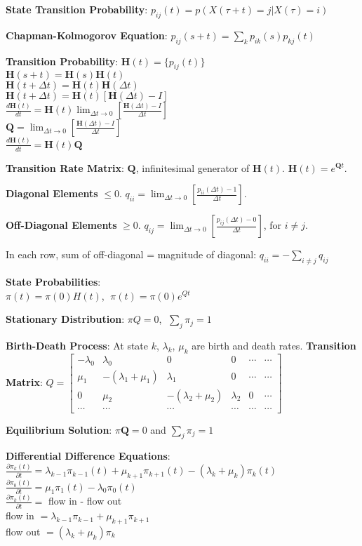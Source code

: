 \documentclass{scrartcl}
\begin{document}
\begin{multicols*}{3}
{\bf State Transition Probability}: $p_{ij}(t) = p(X(\tau+t)=j|X(\tau)=i)$

{\bf Chapman-Kolmogorov Equation}: $p_{ij}(s+t) = \sum_kp_{ik}(s)p_{kj}(t)$

{\bf Transition Probability}:
$\bm{H}(t) = \{p_{ij}(t)\}$ \\
$\bm{H}(s+t) = \bm{H}(s)\bm{H}(t)$ \\
$\bm{H}(t+\Delta t) = \bm{H}(t)\bm{H}(\Delta t)$ \\
$\bm{H}(t+\Delta t) = \bm{H}(t)[\bm{H}(\Delta t)-I]$ \\
$\frac{d\bm{H}(t)}{dt} = \bm{H}(t)\lim_{\Delta t\to 0}[\frac{\bm{H}(\Delta t) - I}{\Delta t}]$ \\
$\bm{Q} = \lim_{\Delta t\to 0}[\frac{\bm{H}(\Delta t)-I}{\Delta t}]$ \\
$\frac{d\bm{H}(t)}{dt} = \bm{H}(t)\bm{Q}$

{\bf Transition Rate Matrix}: $\bm{Q}$, infinitesimal generator of $\bm{H}(t)$. $\bm{H}(t)=e^{\bm{Q}t}$.

{\bf Diagonal Elements} $\leq 0$. $q_{ii}=\lim_{\Delta t\to 0}[\frac{p_{ii}(\Delta t)-1}{\Delta t}]$.

{\bf Off-Diagonal Elements} $\geq 0$. $q_{ij}=\lim_{\Delta t\to 0}[\frac{p_{ij}(\Delta t)-0}{\Delta t}]$, for $i\neq j$.

In each row, sum of off-diagonal = magnitude of diagonal: $q_{ii}=-\sum_{i\neq j}q_{ij}$

{\bf State Probabilities}:\\ $\pi(t)=\pi(0)H(t)$, $\;\pi(t)=\pi(0)e^{Qt}$

{\bf Stationary Distribution}: $\pi Q=0$, $\;\sum_j\pi_j=1$


{\bf Birth-Death Process}: At state $k$, $\lambda_k$, $\mu_k$ are birth and death rates. {\bf Transition Matrix}: $Q=\begin{bmatrix}
-\lambda_0 & \lambda_0 & 0 & 0 & \cdots & \cdots \\
\mu_1 & -(\lambda_1+\mu_1) & \lambda_1 & 0 & \cdots & \cdots \\
0 & \mu_2 & -(\lambda_2+\mu_2) & \lambda_2 & 0 & \cdots \\
\cdots & \cdots & \cdots & \cdots & \cdots & \cdots
\end{bmatrix}$

{\bf Equilibrium Solution}: $\pi\bm{Q}=0$ and $\sum_j\pi_j=1$

{\bf Differential Difference Equations}: $\frac{\partial\pi_k(t)}{\partial t} = \lambda_{k-1}\pi_{k-1}(t)+\mu_{k+1}\pi_{k+1}(t)-(\lambda_k+\mu_k)\pi_k(t)$ \\
$\frac{\partial\pi_0(t)}{\partial t} = \mu_1\pi_1(t) - \lambda_0\pi_0(t)$ \\
$\frac{\partial\pi_k(t)}{\partial t} = $ flow in - flow out \\
flow in $=\lambda_{k-1}\pi_{k-1}+\mu_{k+1}\pi_{k+1}$ \\
flow out $= (\lambda_k+\mu_k)\pi_k$



\end{multicols*}
\end{document}
